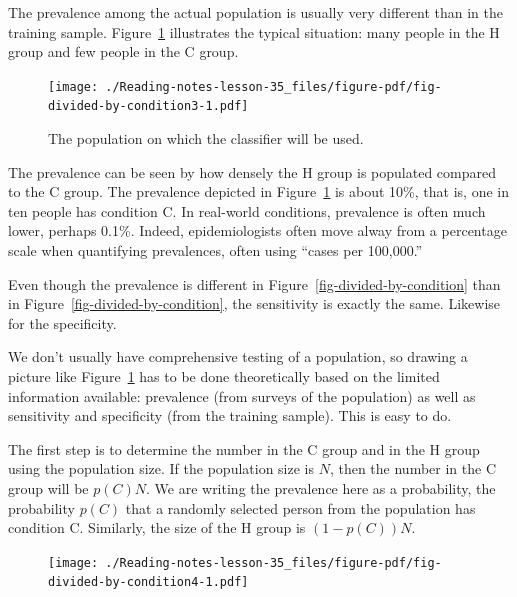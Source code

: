 \documentclass[
  letterpaper,
  DIV=11,
  numbers=noendperiod,
  oneside]{scrreprt}
\begin{document}
The prevalence among the actual population is usually very different
than in the training sample. Figure~\ref{fig-divided-by-condition3}
illustrates the typical situation: many people in the H group and few
people in the C group.

\begin{figure}

{\centering \texttt{[image: ./Reading-notes-lesson-35\_files/figure-pdf/fig-divided-by-condition3-1.pdf]}

}

\caption{\label{fig-divided-by-condition3}The population on which the
classifier will be used.}

\end{figure}

The prevalence can be seen by how densely the H group is populated
compared to the C group. The prevalence depicted in
Figure~\ref{fig-divided-by-condition3} is about 10\%, that is, one in
ten people has condition C. In real-world conditions, prevalence is
often much lower, perhaps 0.1\%. Indeed, epidemiologists often move
alway from a percentage scale when quantifying prevalences, often using
``cases per 100,000.''

Even though the prevalence is different in
Figure~\ref{fig-divided-by-condition} than in
Figure~\ref{fig-divided-by-condition}, the sensitivity is exactly the
same. Likewise for the specificity.

We don't usually have comprehensive testing of a population, so drawing
a picture like Figure~\ref{fig-divided-by-condition3} has to be done
theoretically based on the limited information available: prevalence
(from surveys of the population) as well as sensitivity and specificity
(from the training sample). This is easy to do.

The first step is to determine the number in the C group and in the H
group using the population size. If the population size is \(N\), then
the number in the C group will be \(p(C) N\). We are writing the
prevalence here as a probability, the probability \(p(C)\) that a
randomly selected person from the population has condition C. Similarly,
the size of the H group is \((1-p(C)) N\).

\begin{figure}


{\centering \texttt{[image: ./Reading-notes-lesson-35\_files/figure-pdf/fig-divided-by-condition4-1.pdf]}

}

\end{figure}
\end{document}
